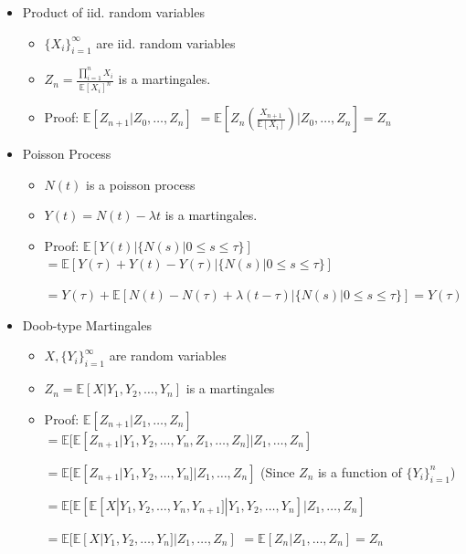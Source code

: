 \documentclass[a4paper]{article}
\begin{document}
\begin{itemize}
\begin{itemize}
            \item Product of iid. random variables
                \begin{itemize}
                    \item $\{X_i\}_{i=1}^\infty$ are iid. random variables
                    \item $Z_n = \frac{\prod_{i=1}^n X_i}{\mathbb{E}[X_i]^n}$ is a martingales.
                    \item Proof: $\mathbb{E}[Z_{n+1}| Z_0, \dots, Z_n]$
                        $= \mathbb{E}[Z_n(\frac{X_{n+1}}{\mathbb{E}[X_i]})| Z_0, \dots, Z_n] = Z_n$
                \end{itemize}
            \item Poisson Process
                \begin{itemize}
                    \item $N(t)$ is a poisson process
                    \item $Y(t) = N(t) - \lambda t$ is a martingales.
                    \item Proof: $\mathbb{E}[Y(t)| \{N(s) | 0 \leq s \leq \tau\}]$
                        $= \mathbb{E}[Y(\tau) + Y(t) - Y(\tau)| \{N(s) | 0 \leq s \leq \tau\}]$

                        $= Y(\tau) + \mathbb{E}[N(t) - N(\tau) + \lambda(t - \tau)| \{N(s) | 0 \leq s \leq \tau\}] = Y(\tau)$
                \end{itemize}
            \item Doob-type Martingales
                \begin{itemize}
                    \item $X, \{Y_i\}_{i=1}^\infty$ are random variables
                    \item $Z_n = \mathbb{E}[X|Y_1, Y_2, \dots, Y_n]$ is a martingales
                    \item Proof: $\mathbb{E}[Z_{n+1}| Z_1, \dots, Z_n]$
                        $= \mathbb{E}[\mathbb{E}[Z_{n+1}| Y_1, Y_2, \dots, Y_n, Z_1, \dots, Z_n] | Z_1, \dots, Z_n]$

                        $= \mathbb{E}[\mathbb{E}[Z_{n+1}| Y_1, Y_2, \dots, Y_n] | Z_1, \dots, Z_n]$ (Since $Z_n$ is a function of $\{Y_i\}_{i=1}^n$)

                        $= \mathbb{E}[\mathbb{E}[\mathbb{E}[X|Y_1, Y_2, \dots, Y_n, Y_{n+1}]| Y_1, Y_2, \dots, Y_n] | Z_1, \dots, Z_n]$

                        $= \mathbb{E}[\mathbb{E}[X| Y_1, Y_2, \dots, Y_n] | Z_1, \dots, Z_n]$
                        $= \mathbb{E}[Z_n| Z_1, \dots, Z_n] = Z_n$
                \end{itemize}
        \end{itemize}
\end{itemize}
\end{document}
